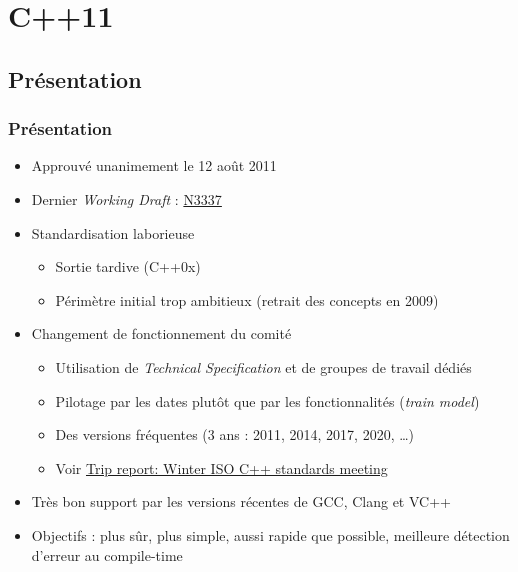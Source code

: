 \documentclass[C++.tex]{subfiles}
\begin{document}
\section{C++11}
\subsection*{Présentation}
\begin{frame}
	\frametitle{Présentation}
	\begin{itemize}
		\item Approuvé unanimement le 12 août 2011
	
	
		\item Dernier \textit{Working Draft} : \href{http://www.open-std.org/jtc1/sc22/wg21/docs/papers/2012/n3337.pdf}{N3337}
	
	
		\item Standardisation laborieuse
		\begin{itemize}
			\item Sortie tardive (C++0x)
			\item Périmètre initial trop ambitieux (retrait des concepts en 2009)
		\end{itemize}
		\item Changement de fonctionnement du comité
		\begin{itemize}
			\item Utilisation de \textit{Technical Specification} et de groupes de travail dédiés
			\item Pilotage par les dates plutôt que par les fonctionnalités (\textit{train model})
			\item Des versions fréquentes (3 ans : 2011, 2014, 2017, 2020, \ldots)
			\item Voir \href{https://herbsutter.com/2016/03/11/trip-report-winter-iso-c-standards-meeting/}{Trip report: Winter ISO C++ standards meeting}
		\end{itemize}
		\item Très bon support par les versions récentes de GCC, Clang et VC++


		\item Objectifs : plus sûr, plus simple, aussi rapide que possible, meilleure détection d'erreur au compile-time
	

\end{itemize}
\end{frame}
\end{document}
